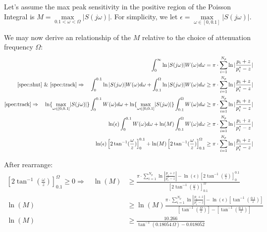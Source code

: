\documentclass{tron}
\begin{document}
Let's assume the max peak sensitivity in the positive region of the Poisson Integral is $M = \underset{0.1<\omega<\Omega}{\max}|S(j\omega)|$. For simplicity, we let $\epsilon = \underset{\omega \in [0, 0.1]}{\max}|S(j\omega)|$.

We may now derive an relationship of the $M$ relative to the choice of attenuation frequency $\Omega$:
\begin{align}
	\int_0^{\infty} \ln |S(j\omega)| W(\omega) d\omega 	& = \pi \cdot \sum_{i=1}^{N_p} \ln |\frac{p_i + z}{p_i^* - z}| \\
\text{\Cref{spec:shut} \& \Cref{spec:track}} \Rightarrow \quad 	\int_0^{0.1} \ln |S(j\omega)| W(\omega) d\omega + \int_{0.1}^{\Omega} \ln |S(j\omega)| W(\omega) d\omega & \geq \pi \cdot \sum_{i=1}^{N_p} \ln |\frac{p_i + z}{p_i^* - z}| \\
\text{\Cref{spec:track}} \Rightarrow \quad 	\ln \{\underset{\omega \in [0, 0.1]}{\max}|S(j\omega)|\} \int_0^{0.1} W(\omega) d\omega + \ln \{\underset{\omega \in [0, 0.1]}{\max}|S(j\omega)|\} \int_{0.1}^{\Omega} W(\omega) d\omega & \geq \pi \cdot \sum_{i=1}^{N_p} \ln |\frac{p_i + z}{p_i^* - z}|  \\
\ln (\epsilon) \int_0^{0.1} W(\omega) d\omega + \ln(M) \int_{0.1}^{\Omega} W(\omega) d\omega & \geq \pi \cdot \sum_{i=1}^{N_p} \ln |\frac{p_i + z}{p_i^* - z}|  \\
\ln (\epsilon) \left[ 2 \tan^{-1} (\frac{\omega}{z})\right]_{0}^{0.1}+ \ln(M) \left[ 2 \tan^{-1} (\frac{\omega}{z})\right]_{0.1}^{\Omega} & \geq \pi \cdot \sum_{i=1}^{N_p} \ln |\frac{p_i + z}{p_i^* - z}| 
\end{align}

After rearrange:
\begin{align}
	\left[ 2 \tan^{-1} (\frac{\omega}{z})\right]_{0.1}^{\Omega} \geq 0 \Rightarrow \quad  \ln(M)  & \geq \frac{ \pi \cdot \sum_{i=1}^{N_p} \ln |\frac{p_i + z}{p_i^* - z}| -  \ln (\epsilon) \left[ 2 \tan^{-1} (\frac{\omega}{z})\right]_{0}^{0.1} }{ \left[ 2 \tan^{-1} (\frac{\omega}{z})\right]_{0.1}^{\Omega} } \\
	\ln(M)  & \geq \ln(M)\frac{ \pi \cdot \sum_{i=1}^{N_p} \ln |\frac{p_i + z}{p_i^* - z}| -  \ln (\epsilon) \left[ \tan^{-1} (\frac{0.1}{z})\right] }{ \left[ \tan^{-1} (\frac{\Omega}{z})\right] - \left[ \tan^{-1} (\frac{0.1}{z})\right] }\\
	\ln(M)  & \geq \frac{10.266}{\tan^{-1}\left(0.18054\,\Omega \right)-0.018052} \label{eqn:M-bound}
\end{align}
\end{document}
